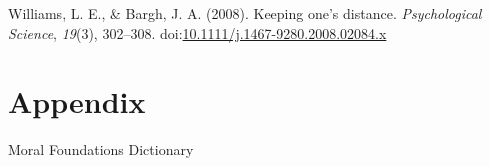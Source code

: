 \documentclass[english,,man]{apa6}
\begin{document}
\leavevmode\hypertarget{ref-Williams2008}{}%
Williams, L. E., \& Bargh, J. A. (2008). Keeping one's distance. \emph{Psychological Science}, \emph{19}(3), 302--308. doi:\href{https://doi.org/10.1111/j.1467-9280.2008.02084.x}{10.1111/j.1467-9280.2008.02084.x}

\endgroup

\newpage

\hypertarget{appendix}{%
\section{Appendix}\label{appendix}}

\begin{table}[tbp]

\begin{center}
\begin{threeparttable}

\caption{\label{tab:appendix_mfd}Moral Foundations Dictionary}

\small{

}
\end{threeparttable}
\end{center}
\end{table}
\end{document}
